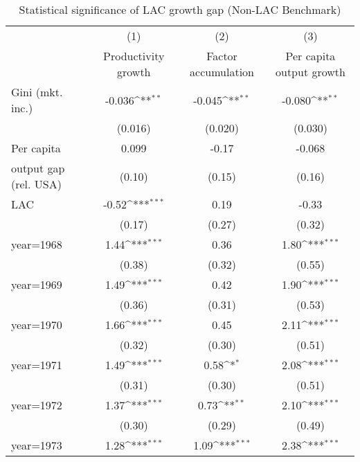 \begin{sidewaystable}[htbp]\centering
\def\sym#1{\ifmmode^{#1}\else\(^{#1}\)\fi}
\caption{Statistical significance of LAC growth gap (Non-LAC Benchmark)}
\begin{tabular}{l*{3}{c}}
\toprule
                &\multicolumn{1}{c}{(1)}&\multicolumn{1}{c}{(2)}&\multicolumn{1}{c}{(3)}\\
                &\multicolumn{1}{c}{Productivity growth}&\multicolumn{1}{c}{Factor accumulation}&\multicolumn{1}{c}{Per capita output growth}\\
\midrule
Gini (mkt. inc.)&   -0.036\sym{**} &   -0.045\sym{**} &   -0.080\sym{**} \\
                &  (0.016)         &  (0.020)         &  (0.030)         \\
\addlinespace
Per capita      &    0.099         &    -0.17         &   -0.068         \\
output gap (rel. USA)&   (0.10)         &   (0.15)         &   (0.16)         \\
\addlinespace
LAC             &    -0.52\sym{***}&     0.19         &    -0.33         \\
                &   (0.17)         &   (0.27)         &   (0.32)         \\
\addlinespace
year=1968       &     1.44\sym{***}&     0.36         &     1.80\sym{***}\\
                &   (0.38)         &   (0.32)         &   (0.55)         \\
\addlinespace
year=1969       &     1.49\sym{***}&     0.42         &     1.90\sym{***}\\
                &   (0.36)         &   (0.31)         &   (0.53)         \\
\addlinespace
year=1970       &     1.66\sym{***}&     0.45         &     2.11\sym{***}\\
                &   (0.32)         &   (0.30)         &   (0.51)         \\
\addlinespace
year=1971       &     1.49\sym{***}&     0.58\sym{*}  &     2.08\sym{***}\\
                &   (0.31)         &   (0.30)         &   (0.51)         \\
\addlinespace
year=1972       &     1.37\sym{***}&     0.73\sym{**} &     2.10\sym{***}\\
                &   (0.30)         &   (0.29)         &   (0.49)         \\
\addlinespace
year=1973       &     1.28\sym{***}&     1.09\sym{***}&     2.38\sym{***}\\

\end{tabular}
\end{sidewaystable}
